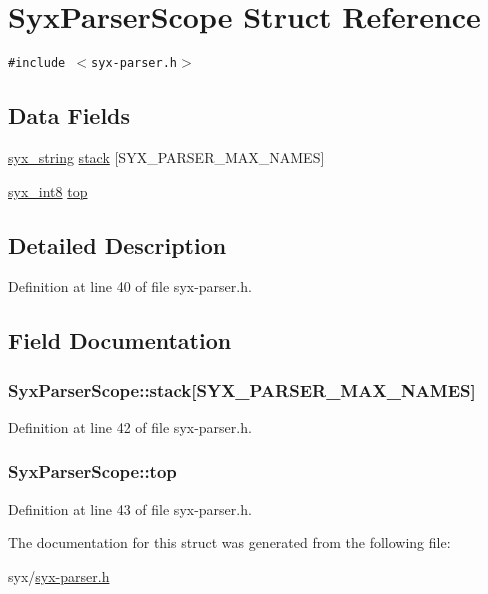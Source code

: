 \hypertarget{struct_syx_parser_scope}{
\section{SyxParserScope Struct Reference}
\label{struct_syx_parser_scope}
}
{\tt \#include $<$syx-parser.h$>$}

\subsection*{Data Fields}
\begin{CompactItemize}
\item 
\hyperlink{syx-types_8h_1bff1fd86072dd98849437bc9dcb35c3}{syx\_\-string} \hyperlink{struct_syx_parser_scope_341779a712dc2b78c1cfb7444b0b642f}{stack} \mbox{[}SYX\_\-PARSER\_\-MAX\_\-NAMES\mbox{]}
\item 
\hyperlink{syx-types_8h_8d3f27f7874e163d9fcda71e7540bdd7}{syx\_\-int8} \hyperlink{struct_syx_parser_scope_2f4316f93084d8b09d89e4017b7040b2}{top}
\end{CompactItemize}


\subsection{Detailed Description}


Definition at line 40 of file syx-parser.h.

\subsection{Field Documentation}
\hypertarget{struct_syx_parser_scope_341779a712dc2b78c1cfb7444b0b642f}{
\subsubsection{ {\bf SyxParserScope::stack}\mbox{[}SYX\_\-PARSER\_\-MAX\_\-NAMES\mbox{]}}}
\label{struct_syx_parser_scope_341779a712dc2b78c1cfb7444b0b642f}




Definition at line 42 of file syx-parser.h.\hypertarget{struct_syx_parser_scope_2f4316f93084d8b09d89e4017b7040b2}{
\subsubsection{ {\bf SyxParserScope::top}}}
\label{struct_syx_parser_scope_2f4316f93084d8b09d89e4017b7040b2}




Definition at line 43 of file syx-parser.h.

The documentation for this struct was generated from the following file:\begin{CompactItemize}
\item 
syx/\hyperlink{syx-parser_8h}{syx-parser.h}\end{CompactItemize}
